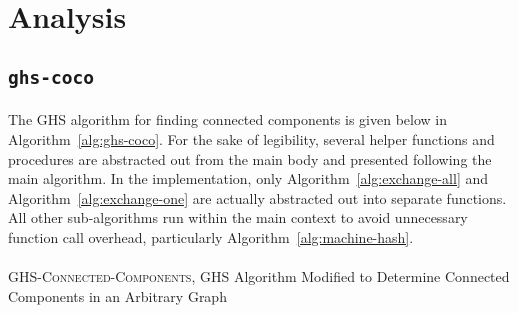 \documentclass[11pt,epsf]{article}
\begin{document}
\section{Analysis}{
  \subsection{\texttt{ghs-coco}}{
    \paragraph{}{
      The GHS algorithm for finding connected components is given below in Algorithm~\ref{alg:ghs-coco}.
      For the sake of legibility, several helper functions and procedures are abstracted out
      from the main body and presented following the main algorithm. In the implementation,
      only Algorithm~\ref{alg:exchange-all} and Algorithm~\ref{alg:exchange-one} are actually abstracted out into separate functions.
      All other sub-algorithms run within the main context to avoid unnecessary function call overhead,
      particularly Algorithm~\ref{alg:machine-hash}.
    }
    \paragraph{}{
      \begin{algorithm}
        \footnotesize
        \caption{\textsc{GHS-Connected-Components}, GHS Algorithm Modified to Determine Connected Components in an Arbitrary Graph}
        \label{alg:ghs-coco}
        \begin{algorithmic}
          \ENDIF


          \ENDFOR


\end{algorithmic}
\end{algorithm}}}}
\end{document}
